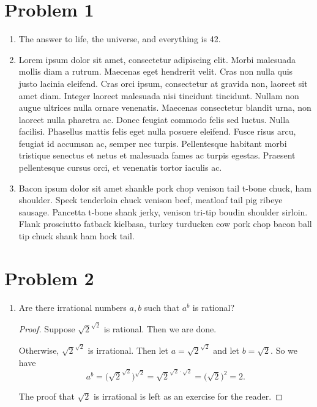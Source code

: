 \documentclass[letterpaper]{article}
\begin{document}
  \section*{Problem 1}
    \begin{enumerate}
      \item
      The answer to life, the universe, and everything is 42.

      \item
      Lorem ipsum dolor sit amet, consectetur adipiscing elit. Morbi malesuada mollis diam a rutrum. Maecenas eget hendrerit velit. Cras non nulla quis justo lacinia eleifend. Cras orci ipsum, consectetur at gravida non, laoreet sit amet diam. Integer laoreet malesuada nisi tincidunt tincidunt. Nullam non augue ultrices nulla ornare venenatis. Maecenas consectetur blandit urna, non laoreet nulla pharetra ac. Donec feugiat commodo felis sed luctus. Nulla facilisi. Phasellus mattis felis eget nulla posuere eleifend. Fusce risus arcu, feugiat id accumsan ac, semper nec turpis. Pellentesque habitant morbi tristique senectus et netus et malesuada fames ac turpis egestas. Praesent pellentesque cursus orci, et venenatis tortor iaculis ac.

      \item
      Bacon ipsum dolor sit amet shankle pork chop venison tail t-bone chuck, ham shoulder. Speck tenderloin chuck venison beef, meatloaf tail pig ribeye sausage. Pancetta t-bone shank jerky, venison tri-tip boudin shoulder sirloin. Flank prosciutto fatback kielbasa, turkey turducken cow pork chop bacon ball tip chuck shank ham hock tail.
    \end{enumerate}

  \section*{Problem 2}
    \begin{enumerate}
      \item
      Are there irrational numbers $a, b$ such that $a^b$ is rational?

      \begin{proof}
        Suppose $\sqrt{2}^{\sqrt{2}}$ is rational. Then we are done.

        Otherwise, $\sqrt{2}^{\sqrt{2}}$ is irrational. Then let $a = \sqrt{2}^{\sqrt{2}}$ and let $b=\sqrt{2}$. So we have
        \[ a^b = \Bigg(\!\sqrt{2}^{\sqrt{2}}\Bigg)^{\sqrt{2}} = \sqrt{2}^{\sqrt{2} \cdot \sqrt{2}} = \bigg(\!\sqrt{2}\bigg)^2 = 2. \]

        The proof that $\sqrt{2}$ is irrational is left as an exercise for the reader.
      \end{proof}
    \end{enumerate}
\end{document}
